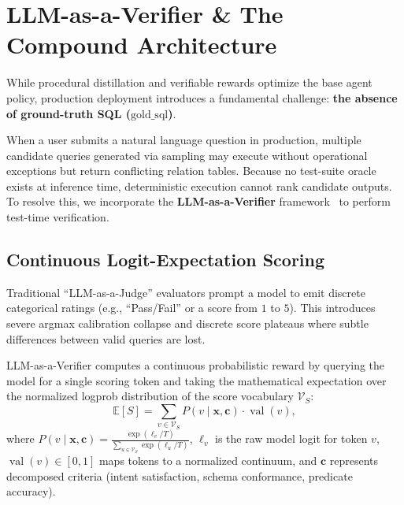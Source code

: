 \documentclass{article}
\theoremstyle{plain}
\theoremstyle{definition}
\theoremstyle{remark}
\begin{document}
\section{LLM-as-a-Verifier \& The Compound Architecture}
\label{sec:verifier_framework}

While procedural distillation and verifiable rewards optimize the base agent policy, production deployment introduces a fundamental challenge: \textbf{the absence of ground-truth SQL ($\text{gold\_sql}$)}. 

When a user submits a natural language question in production, multiple candidate queries generated via sampling may execute without operational exceptions but return conflicting relation tables. Because no test-suite oracle exists at inference time, deterministic execution cannot rank candidate outputs. To resolve this, we incorporate the \textbf{LLM-as-a-Verifier} framework~\citep{llmverifier2026} to perform test-time verification.

\subsection{Continuous Logit-Expectation Scoring}
Traditional ``LLM-as-a-Judge'' evaluators prompt a model to emit discrete categorical ratings (e.g., ``Pass/Fail'' or a score from $1$ to $5$). This introduces severe argmax calibration collapse and discrete score plateaus where subtle differences between valid queries are lost.

LLM-as-a-Verifier computes a continuous probabilistic reward by querying the model for a single scoring token and taking the mathematical expectation over the normalized logprob distribution of the score vocabulary $\mathcal{V}_S$:
\begin{equation}
    \mathbb{E}[S] = \sum_{v \in \mathcal{V}_S} P(v \mid \mathbf{x}, \mathbf{c}) \cdot \operatorname{val}(v),
\end{equation}
where $P(v \mid \mathbf{x}, \mathbf{c}) = \frac{\exp(\ell_v / T)}{\sum_{u \in \mathcal{V}_S} \exp(\ell_u / T)}$, $\ell_v$ is the raw model logit for token $v$, $\operatorname{val}(v) \in [0, 1]$ maps tokens to a normalized continuum, and $\mathbf{c}$ represents decomposed criteria (intent satisfaction, schema conformance, predicate accuracy).
\end{document}
